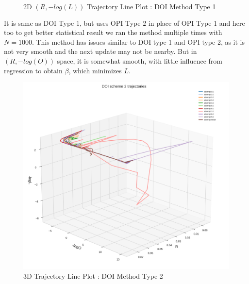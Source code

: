 \begin{figure}[H]
\begin{minipage}[t]{0.5511\textwidth}
        \captionsetup{font=tiny}
        \caption{2D $(R,-log(L))$ Trajectory Line Plot : DOI Method Type 1}
        \label{fig:corr_matrix_ts_qrt_data}
    \end{minipage}
\end{figure}
It is same as DOI Type 1, but uses OPI Type 2 in place of OPI Type 1 and here too to get better statistical result we ran the method multiple times with $N=1000$. This method has issues similar to DOI type 1 and OPI type 2, as it is not very smooth and the next update may not be nearby. But in $(R,-log(O))$ space, it is somewhat smooth, with little influence from regression to obtain $\beta$, which minimizes $L$.
\begin{figure}[H]
    \centering
    \begin{minipage}[t]{0.45\textwidth}
        \centering
        \includegraphics[width=\textwidth]{images/1-DOI scheme 2 mean trajectory.png}
        \captionsetup{font=tiny}
        \caption{3D Trajectory Line Plot : DOI Method Type 2}
        \label{fig:cumulative_returns}
    \end{minipage}%
    \begin{minipage}[t]{0.5511\textwidth}
        \centering

\end{minipage}
\end{figure}
